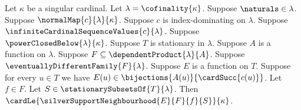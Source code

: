\begin{theorem}\label{silver_support_neighbourhood_cardinal_bound}
    Let $\kappa$ be a singular cardinal.
    Let $\lambda=\cofinality{\kappa}$.
    Suppose $\naturals\in\lambda$.
    Suppose $\normalMap{c}{\lambda}{\kappa}$.
    Suppose $c$ is index-dominating on $\lambda$.
    Suppose $\infiniteCardinalSequenceValues{c}{\lambda}$.
    Suppose $\powerClosedBelow{\lambda}{\kappa}$.
    Suppose $T$ is stationary in $\lambda$.
    Suppose $A$ is a function on $\lambda$.
    Suppose $F\subseteq\dependentProduct{\lambda}{A}$.
    Suppose $\eventuallyDifferentFamily{F}{\lambda}$.
    Suppose $E$ is a function on $T$.
    Suppose for every $u\in T$ we have
        $E(u)\in\bijections{A(u)}{\cardSucc{c(u)}}$.
    Let $f\in F$.
    Let $S\in\stationarySubsetsOf{T}{\lambda}$.
    Then $\cardLe{\silverSupportNeighbourhood{E}{F}{f}{S}}{\kappa}$.
\end{theorem}
